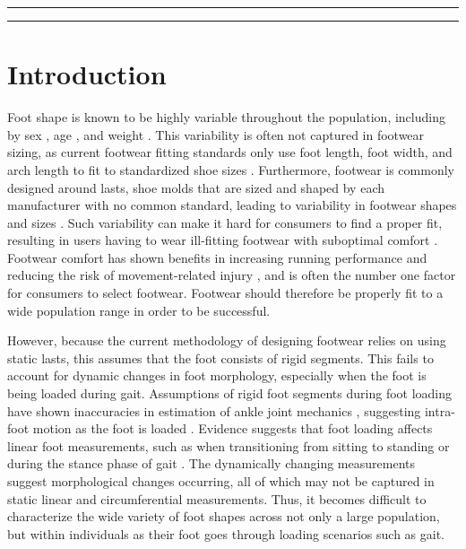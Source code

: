 \documentclass[preprint]{elsarticle}
\begin{document}
\begin{center}\rule{0.5\linewidth}{0.5pt}\end{center}

\begin{center}\rule{0.5\linewidth}{0.5pt}\end{center}

\hypertarget{sec:intro}{%
\section{Introduction}\label{sec:intro}}

Foot shape is known to be highly variable throughout the population, including by sex \citep{Wunderlich2001, Krauss2008, Krauss2010}, age \citep{Tomassoni2014}, and weight \citep{Price2016}.
This variability is often not captured in footwear sizing, as current footwear fitting standards only use foot length, foot width, and arch length to fit to standardized shoe sizes \citep{ASTM2017}.
Furthermore, footwear is commonly designed around lasts, shoe molds that are sized and shaped by each manufacturer with no common standard, leading to variability in footwear shapes and sizes \citep{Jurca2013, Wannop2019}.
Such variability can make it hard for consumers to find a proper fit, resulting in users having to wear ill-fitting footwear with suboptimal comfort \citep{Dobson2018b}.
Footwear comfort has shown benefits in increasing running performance \citep{Luo2009} and reducing the risk of movement-related injury \citep{Mundermann2001a}, and is often the number one \citep{Martinez-Martinez2017} factor for consumers to select footwear.
Footwear should therefore be properly fit to a wide population range in order to be successful.

However, because the current methodology of designing footwear relies on using static lasts, this assumes that the foot consists of rigid segments.
This fails to account for dynamic changes in foot morphology, especially when the foot is being loaded during gait.
Assumptions of rigid foot segments during foot loading have shown inaccuracies in estimation of ankle joint mechanics \citep{Zelik2018, Kessler2020}, suggesting intra-foot motion as the foot is loaded \citep{Lundgren2008, Wolf2008}.
Evidence suggests that foot loading affects linear foot measurements, such as when transitioning from sitting to standing \citep{Xiong2009, Oladipo2008} or during the stance phase of gait \citep{Kouchi2009, Barisch-Fritz2014, Grau2018}.
The dynamically changing measurements suggest morphological changes occurring, all of which may not be captured in static linear and circumferential measurements.
Thus, it becomes difficult to characterize the wide variety of foot shapes across not only a large population, but within individuals as their foot goes through loading scenarios such as gait.
\end{document}
